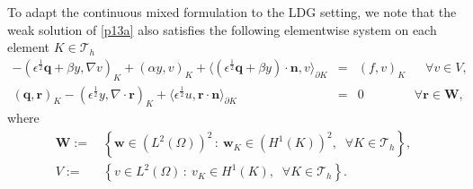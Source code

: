 \documentclass[a4paper,10pt]{article}
\newcommand{\set}[2]{\left\{{#1}\,:~{#2}\right\}}
\newcommand{\hF}{{\frac{1}{2}}}
\newcommand{\cT}{{\mathcal{T}}}
\newcommand{\bq}{{\mathbf{q}}}
\newcommand{\bn}{{\mathbf{n}}}
\numberwithin{theorem}{section}
\begin{document}
To adapt the continuous mixed formulation to the LDG setting, we note that the weak solution of \eqref{p13a} also satisfies  the following elementwise system on each element $K \in \cT_h$
\begin{subequations}\label{p14}
\begin{eqnarray}
-(\epsilon^\hF \bq + \beta y, \nabla v)_K + (\alpha y, v)_K + \langle ( \epsilon^\hF \bq + \beta y ) \cdot \bn, v \rangle_{\partial K} &=& (f,v)_K   \quad \;\; \forall  v \in V, \label{p14a} \\
( \bq, \mathbf{r} )_K - ( \epsilon^\hF y,  \nabla \cdot  \mathbf{ r})_K  +\langle \epsilon^\hF u,  \mathbf{r} \cdot \bn \rangle_{\partial K} &=&0 \qquad \qquad \forall \mathbf{r} \in \mathbf{W}, \label{p14b}
\end{eqnarray}
\end{subequations}
where
\begin{equation*}
\begin{split}
    \mathbf{W} :=& \, \set{\mathbf{w} \in \left( L^2(\Omega) \right)^2}{\mathbf{w}_K \in \left( H^1(K) \right)^2, \;\; \forall K \in \cT_h}, \\
    V :=& \, \set{v\in L^2(\Omega)}{v_K \in H^1(K), \;\; \forall K \in \cT_h}.
\end{split}
\end{equation*}
\end{document}
